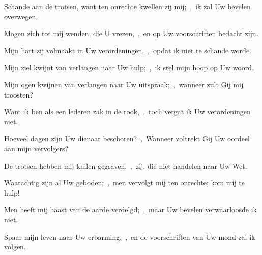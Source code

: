 \documentclass[12pt,twoside,a5paper]{article}
\begin{document}
\begin{halfparskip}
  Schande aan de trotsen, want ten onrechte kwellen zij mij;~\sep\ ik zal Uw bevelen overwegen.

  Mogen zich tot mij wenden, die U vrezen,~\sep\ en op Uw voorschriften bedacht zijn.

  Mijn hart zij volmaakt in Uw verordeningen,~\sep\ opdat ik niet te schande worde.

  Mijn ziel kwijnt van verlangen naar Uw hulp;~\sep\ ik stel mijn hoop op Uw woord.

  Mijn ogen kwijnen van verlangen naar Uw uitspraak;~\sep\ wanneer zult Gij mij troosten?

  Want ik ben als een lederen zak in de rook,~\sep\ toch vergat ik Uw verordeningen niet.

  Hoeveel dagen zijn Uw dienaar beschoren?~\sep\ Wanneer voltrekt Gij Uw oordeel aan mijn vervolgers?

  De trotsen hebben mij kuilen gegraven,~\sep\ zij, die niet handelen naar Uw Wet.

  Waarachtig zijn al Uw geboden;~\sep\ men vervolgt mij ten onrechte; kom mij te hulp!

  Men heeft mij haast van de aarde verdelgd;~\sep\ maar Uw bevelen verwaarloosde ik niet.

  Spaar mijn leven naar Uw erbarming,~\sep\ en de voorschriften van Uw mond zal ik volgen.
\end{halfparskip}
\end{document}
